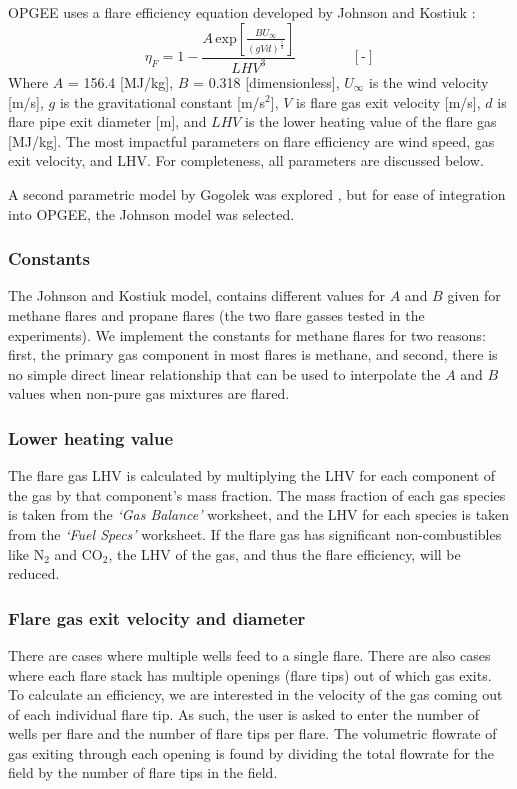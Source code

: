 \documentclass[11pt]{report}
\newcommand{\sheet}[1]{\textit{`{#1}'}}
\newcommand{\eqnunit}[1]{\quad\quad \scriptstyle{\left[\text{#1}\right]}}
\begin{document}
OPGEE uses a flare efficiency equation developed by Johnson and Kostiuk \cite{Johnson2002}: 
\begin{equation}\label{eq:flare_eta}
\eta_F =1-\frac{A \,\textrm{exp}\left[{\frac{BU_{\infty}}{\left(gVd\right)^\frac{1}{3}}}\right]}{LHV^3} \quad\quad\eqnunit{-}
\end{equation}
Where $A$ = 156.4 [MJ/kg], $B$ = 0.318 [dimensionless], $U_{\infty}$ is the wind velocity [m/s], $g$ is the gravitational constant [m/s$^2$], $V$ is flare gas exit velocity [m/s], $d$ is flare pipe exit diameter [m], and $LHV$ is the lower heating value of the flare gas [MJ/kg]. The most impactful parameters on flare efficiency are wind speed, gas exit velocity, and LHV. For completeness, all parameters are discussed below.

A second parametric model by Gogolek was explored \cite{Gogolek2012}, but for ease of integration into OPGEE, the Johnson model was selected.
\subsubsection{Constants}
The Johnson and Kostiuk model, contains different values for $A$ and $B$ given for methane flares and propane flares (the two flare gasses tested in the experiments). We implement the constants for methane flares for two reasons: first, the primary gas component in most flares is methane, and second, there is no simple direct linear relationship that can be used to interpolate the $A$ and $B$ values when non-pure gas mixtures are flared.
\subsubsection{Lower heating value}
The flare gas LHV is calculated by multiplying the LHV for each component of the gas by that component's mass fraction. The mass fraction of each gas species is taken from the \sheet{Gas Balance} worksheet, and the LHV for each species is taken from the \sheet{Fuel Specs} worksheet. If the flare gas has significant non-combustibles like N$_2$ and CO$_2$, the LHV of the gas, and thus the flare efficiency, will be reduced.
\subsubsection{Flare gas exit velocity and diameter}

There are cases where multiple wells feed to a single flare. There are also cases where each flare stack has multiple openings (flare tips) out of which gas exits. To calculate an efficiency, we are interested in the velocity of the gas coming out of each individual flare tip. As such, the user is asked to enter the number of wells per flare  and the number of flare tips per flare.  The volumetric flowrate of gas exiting through each opening is found by dividing the total flowrate for the field by the number of flare tips in the field.
\end{document}
